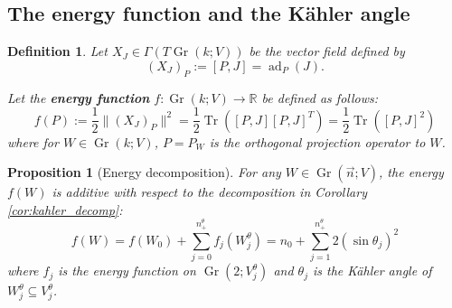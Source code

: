 \documentclass[12pt, final]{article}
\def\R{\mathbb{R}}
\def\ad{\operatorname{ad}}
\def\Gr{\operatorname{Gr}}
\def\Tr{\operatorname{Tr}}
\newtheorem{proposition}[theorem]{Proposition}
\newtheorem{definition}[theorem]{Definition}
\begin{document}
\subsection{The energy function and the K\"{a}hler angle}\label{subsec:energy_function}

\begin{definition} \label{def:energy}
Let $X_J \in \Gamma(T\Gr(k; V))$ be the vector field defined by
\[ (X_J)_P:= [P, J] = \ad_{P}(J).\]

Let the \textbf{energy function} $f: \Gr(k; V) \to \R$ be defined as follows:
\[
f(P) := \frac{1}{2} \lVert (X_J)_P \rVert^2 = \frac{1}{2} \Tr\left( [P, J] [P, J]^T \right) = \frac{1}{2} \Tr([P, J]^2)
\]
where for $W \in \Gr(k; V)$, $P = P_W$ is the orthogonal projection  operator to $W$.
\end{definition}

\begin{proposition}[Energy decomposition] \label{prop:energy_decomposition} For any $W \in \Gr(\vec{n}; V)$, the energy $f(W)$ is additive with respect to the decomposition in Corollary \ref{cor:kahler_decomp}:
  \[ f(W) = f(W_0) + \sum_{j = 0}^{n_+^\theta} f_j(W_j^\theta) = n_0 + \sum_{j = 1}^{n_+^\theta} 2(\sin \theta_j)^2\]
where $f_j$ is the energy function on $\Gr(2; V_j^\theta)$ and $\theta_{j}$ is the K\"{a}hler angle of $W_j^\theta \subseteq V_j^\theta$.
\end{proposition}
\end{document}
